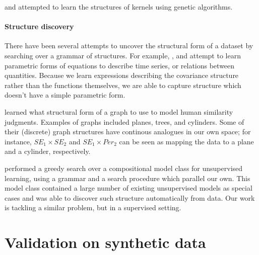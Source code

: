 \documentclass[twoside]{article}
\begin{document}
\citet{diosan2007evolving} and \citet{bing2010gp} attempted to learn the structures of kernels using genetic algorithms.  


\paragraph{Structure discovery}

There have been several attempts to uncover the structural form of a dataset by searching over a grammar of structures. For example, \cite{schmidt2009distilling}, \cite{todorovski1997declarative} and \cite{washio1999discovering} attempt to learn parametric forms of equations to describe time series, or relations between quantities. Because we learn expressions describing the covariance structure rather than the functions themselves, we are able to capture structure which doesn't have a simple parametric form.

\citet{kemp2008discovery} learned what structural form of a graph to use to model human similarity judgments. Examples of graphs included planes, trees, and cylinders. Some of their (discrete) graph structures have continous analogues in our own space; for instance, $SE_1 \times SE_2$ and $SE_1 \times Per_2$ can be seen as mapping the data to a plane and a cylinder, respectively.

\citet{grosse2012exploiting} performed a greedy search over a compositional model class for unsupervised learning, using a grammar and a search procedure which parallel our own. This model class contained a large number of existing unsupervised models as special cases and was able to discover such structure automatically from data. Our work is tackling a similar problem, but in a supervised setting.

\section{Validation on synthetic data}
\label{sec:synthetic}
\end{document}
